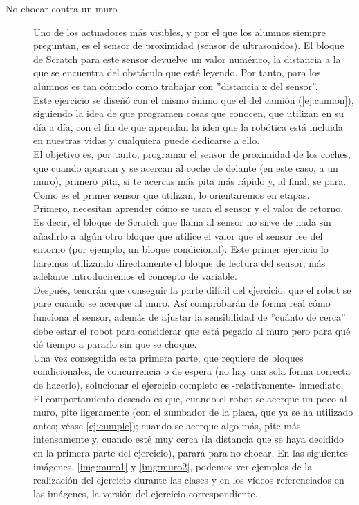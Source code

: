 \begin{description}
	
\item [No chocar contra un muro]\label{ej:muro}
Uno de los actuadores más visibles, y por el que los alumnos siempre preguntan, es el sensor de proximidad (sensor de ultrasonidos). El bloque de Scratch para este sensor devuelve un valor numérico, la distancia a la que se encuentra del obstáculo que esté leyendo. Por tanto, para los alumnos es tan cómodo como trabajar con ''distancia x del sensor''. \\
Este ejercicio se diseñó con el mismo ánimo que el del camión (\ref{ej:camion}), siguiendo la idea de que programen cosas que conocen, que utilizan en su día a día, con el fin de que aprendan la idea que la robótica está incluida en nuestras vidas y cualquiera puede dedicarse a ello.\\
El objetivo es, por tanto, programar el sensor de proximidad de los coches, que cuando aparcan y se acercan al coche de delante (en este caso, a un muro), primero pita, si te acercas más pita más rápido y, al final, se para. Como es el primer sensor que utilizan, lo orientaremos en etapas. \\
Primero, necesitan aprender cómo se usan el sensor y el valor de retorno. Es decir, el bloque de Scratch que llama al sensor no sirve de nada sin añadirlo a algún otro bloque que utilice el valor que el sensor lee del entorno (por ejemplo, un bloque condicional). Este primer ejercicio lo haremos utilizando directamente el bloque de lectura del sensor; más adelante introduciremos el concepto de variable.\\
Después, tendrán que conseguir la parte difícil del ejercicio: que el robot se pare cuando se acerque al muro. Así comprobarán de forma real cómo funciona el sensor, además de ajustar la sensibilidad de ''cuánto de cerca'' debe estar el robot para considerar que está pegado al muro pero para qué dé tiempo a pararlo sin que se choque.\\
Una vez conseguida esta primera parte, que requiere de bloques condicionales, de concurrencia o de espera (no hay una sola forma correcta de hacerlo), solucionar el ejercicio completo es -relativamente- inmediato. El comportamiento deseado es que, cuando el robot se acerque un poco al muro, pite ligeramente (con el zumbador de la placa, que ya se ha utilizado antes; véase \ref{ej:cumple}); cuando se acerque algo más, pite más intensamente y, cuando esté muy cerca (la distancia que se haya decidido en la primera parte del ejercicio), parará para no chocar.
En las siguientes imágenes, \ref{img:muro1} y \ref{img:muro2}, podemos ver ejemplos de la realización del ejercicio durante las clases y en los vídeos referenciados en las imágenes, la versión del ejercicio correspondiente. \\


\end{description}
